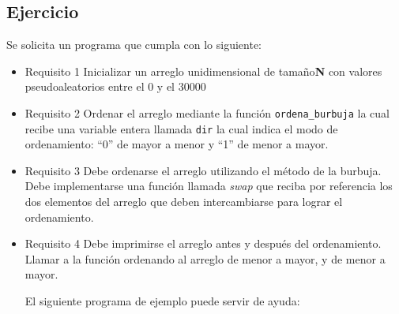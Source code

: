 \subsection{Ejercicio}
Se solicita un programa que cumpla con lo siguiente:
\begin{itemize}[a)]
  \item Requisito 1
    Inicializar un arreglo unidimensional de tamaño\textbf{N} con valores pseudoaleatorios entre el 0 y el 30000

  \item Requisito 2
    Ordenar el arreglo mediante la función \texttt{ordena\_burbuja} la cual recibe una variable entera llamada \texttt{dir} la cual indica el modo de ordenamiento: ``0'' de mayor a menor y ``1'' de menor a mayor.

  \item Requisito 3
    Debe ordenarse el arreglo utilizando el método de la burbuja. Debe implementarse una función llamada \textit{swap} que reciba por referencia los dos elementos del arreglo que deben intercambiarse para lograr el ordenamiento.

  \item Requisito 4
    Debe imprimirse el arreglo antes y después del ordenamiento. Llamar a la función ordenando al arreglo de menor a mayor, y de menor a mayor.

    El siguiente programa de ejemplo puede servir de ayuda:
    \pagebreak

    \lstset{inputencoding=utf8/latin1}
    
\end{itemize}
